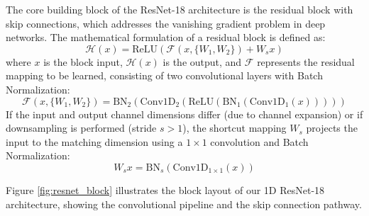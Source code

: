 \documentclass[12pt,a4paper]{report}
\begin{document}
The core building block of the ResNet-18 architecture is the residual block with skip connections, which addresses the vanishing gradient problem in deep networks. The mathematical formulation of a residual block is defined as:
\begin{equation}
    \mathcal{H}(x) = \text{ReLU}(\mathcal{F}(x, \{W_{1}, W_{2}\}) + W_{s} x)
\end{equation}
where $x$ is the block input, $\mathcal{H}(x)$ is the output, and $\mathcal{F}$ represents the residual mapping to be learned, consisting of two convolutional layers with Batch Normalization:
\begin{equation}
    \mathcal{F}(x, \{W_{1}, W_{2}\}) = \text{BN}_{2}\left( \text{Conv1D}_{2}\left( \text{ReLU}\left( \text{BN}_{1}\left( \text{Conv1D}_{1}(x) \right) \right) \right) \right)
\end{equation}
If the input and output channel dimensions differ (due to channel expansion) or if downsampling is performed (stride $s > 1$), the shortcut mapping $W_s$ projects the input to the matching dimension using a $1 \times 1$ convolution and Batch Normalization:
\begin{equation}
    W_s x = \text{BN}_{s}\left( \text{Conv1D}_{1\times1}(x) \right)
\end{equation}

Figure \ref{fig:resnet_block} illustrates the block layout of our 1D ResNet-18 architecture, showing the convolutional pipeline and the skip connection pathway.
\end{document}
